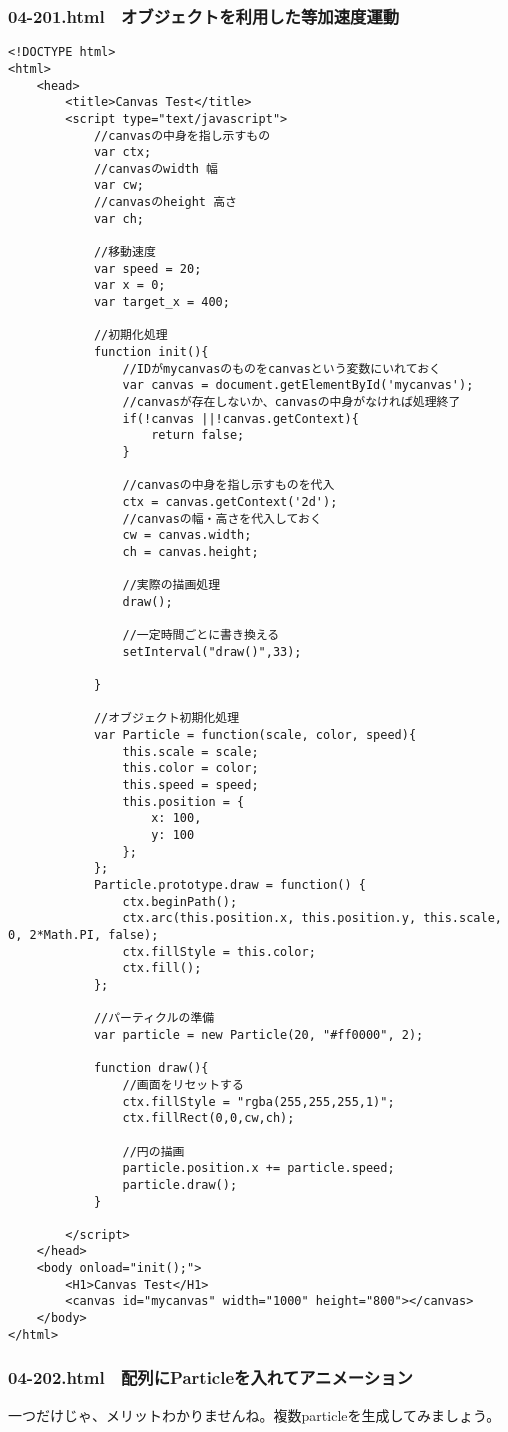 \documentclass[mingoth,11pt,a4j,uplatex]{jsarticle}
\begin{document}
\subsubsection{04-201.html　オブジェクトを利用した等加速度運動}
\begin{lstlisting}[caption=　オブジェクトを利用した等加速度運動]
<!DOCTYPE html>
<html>
	<head>
		<title>Canvas Test</title>
		<script type="text/javascript">
			//canvasの中身を指し示すもの
			var ctx;
			//canvasのwidth 幅
			var cw;
			//canvasのheight 高さ
			var ch;
			
			//移動速度
			var speed = 20;
			var x = 0;
			var target_x = 400;
			
			//初期化処理
			function init(){
				//IDがmycanvasのものをcanvasという変数にいれておく
				var canvas = document.getElementById('mycanvas');
				//canvasが存在しないか、canvasの中身がなければ処理終了
				if(!canvas ||!canvas.getContext){
					return false;
				}
				
				//canvasの中身を指し示すものを代入
				ctx = canvas.getContext('2d');
				//canvasの幅・高さを代入しておく
				cw = canvas.width;
				ch = canvas.height;
				
				//実際の描画処理
				draw();
				
				//一定時間ごとに書き換える
				setInterval("draw()",33);

			}
			
			//オブジェクト初期化処理
			var Particle = function(scale, color, speed){
				this.scale = scale;
				this.color = color;
				this.speed = speed;
				this.position = {
					x: 100,
					y: 100
				};
			};
			Particle.prototype.draw = function() {
				ctx.beginPath();
				ctx.arc(this.position.x, this.position.y, this.scale, 0, 2*Math.PI, false);
				ctx.fillStyle = this.color;
				ctx.fill();
			};
			
			//パーティクルの準備
			var particle = new Particle(20, "#ff0000", 2);
			
			function draw(){
				//画面をリセットする
				ctx.fillStyle = "rgba(255,255,255,1)";
				ctx.fillRect(0,0,cw,ch);
				
				//円の描画
				particle.position.x += particle.speed;
				particle.draw();
			}
			
		</script>
	</head>
	<body onload="init();">
		<H1>Canvas Test</H1>
		<canvas id="mycanvas" width="1000" height="800"></canvas>
	</body>
</html>
\end{lstlisting}

\subsubsection{04-202.html　配列にParticleを入れてアニメーション}
一つだけじゃ、メリットわかりませんね。複数particleを生成してみましょう。
\end{document}
